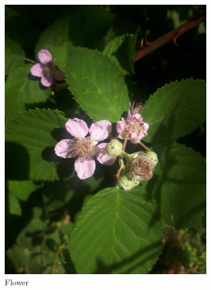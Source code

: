 \begin{figure}
\begin{subfigure}{0.48\textwidth}
    \includegraphics[width=\textwidth]{rubus/armeniacus_flower_01}
    \caption{Flower}
    \label{fig:rub:armeniacus:flower}
\end{subfigure}
\hfill
\begin{subfigure}{0.48\textwidth}

\end{subfigure}
\end{figure}
